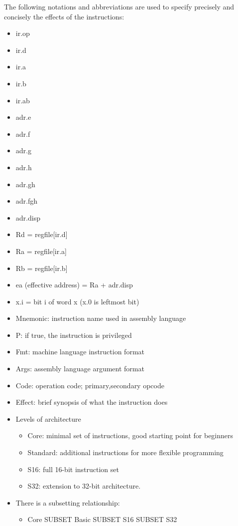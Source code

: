 \documentclass[11pt]{article}
\begin{document}
The following notations and abbreviations are used to specify
precisely and concisely the effects of the instructions:

\begin{itemize}
\item ir.op
\item ir.d
\item ir.a
\item ir.b
\item ir.ab
\item adr.e
\item adr.f
\item adr.g
\item adr.h
\item adr.gh
\item adr.fgh
\item adr.disp
\item Rd = regfile[ir.d]
\item Ra = regfile[ir.a]
\item Rb = regfile[ir.b]
\item ea (effective address) = Ra + adr.disp
\item x.i = bit i of word x (x.0 is leftmost bit)

\item Mnemonic: instruction name used in assembly language
\item P: if true, the instruction is privileged
\item Fmt: machine language instruction format
\item Args: assembly language argument format
\item Code: operation code; primary,secondary opcode
\item Effect: brief synopsis of what the instruction does

\item Levels of architecture
\begin{itemize}
\item Core: minimal set of instructions, good starting point for beginners
\item Standard: additional instructions for more flexible programming
\item S16: full 16-bit instruction set
\item S32: extension to 32-bit architecture.
\end{itemize}
\item There is a subsetting relationship:
\begin{itemize}
\item Core SUBSET Basic SUBSET S16 SUBSET S32
\end{itemize}
\end{itemize}
\end{document}
